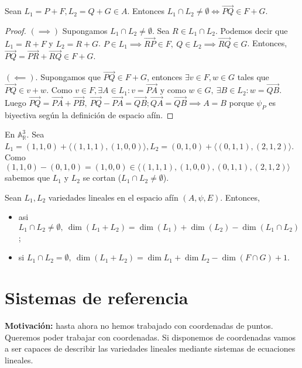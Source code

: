 \documentclass[14pt]{book}
\begin{document}
\begin{pro}
	Sean $L_1 = P + F, L_2 = Q + G \in A$. Entonces $L_1 \cap L_2 ≠ \emptyset \iff \overrightarrow{PQ} \in F + G$.
\end{pro}

\begin{proof}
	$(\implies)$ Supongamos $L_1 \cap L_2 ≠ \emptyset$. Sea $R \in L_1 \cap L_2$. Podemos decir que $L_1 = R + F$ y $L_2 = R + G$. $P \in L_1 \implies \overrightarrow{RP} \in F,\ Q \in L_2 \implies \overrightarrow{RQ} \in G$. Entonces, $\overrightarrow{PQ} = \overrightarrow{PR} + \overrightarrow{RQ} \in F + G$.
	
	$(\impliedby)$. Supongamos que $\overrightarrow{PQ} \in F + G$, entonces $\exists v \in F, w \in G$ tales que $\overrightarrow{PQ} \in v + w$. Como $v \in F, \exists A \in L_1 : v = \overrightarrow{PA}$ y como $w \in G,\ \exists B \in L_2 : w = \overrightarrow{QB}$. Luego $\overrightarrow{PQ} = \overrightarrow{PA} + \overrightarrow{PB},\ \overrightarrow{PQ} - \overrightarrow{PA} = \overrightarrow{QB}; \overrightarrow{QA} = \overrightarrow{QB} \implies A = B$ porque $\psi_P$ es biyectiva según la definición de espacio afín.
\end{proof}

\begin{ej}
	En $\mathbb{A}_\mathbb{R}^3$. Sea $L_1 = (1,1,0) + \langle(1,1,1),(1,0,0)\rangle, L_2 = (0,1,0) + \langle (0,1,1),(2,1,2)\rangle$. Como $(1,1,0) - (0,1,0) = (1,0,0) \in \langle (1,1,1),(1,0,0),(0,1,1),(2,1,2)\rangle$ sabemos que $L_1$ y $L_2$ se cortan ($L_1 \cap L_2 ≠ \emptyset$).
\end{ej}

\begin{tm}
	Sean $L_1, L_2$ variedades lineales en el espacio afín $(A, \psi, E)$. Entonces,
	\begin{itemize}
		\item asi $L_1 \cap L_2 ≠ \emptyset,\ \dim(L_1 + L_2) = \dim(L_1) + \dim(L_2) - \dim(L_1 \cap L_2)$;
		\item si $L_1 \cap L_2 = \emptyset,\ \dim (L_1 + L_2) = \dim L_1 + \dim L_2 - \dim(F \cap G) + 1$.
	\end{itemize}
\end{tm}


\section{Sistemas de referencia}
\textbf{Motivación:} hasta ahora no hemos trabajado con coordenadas de puntos. Queremos poder trabajar con coordenadas. Si disponemos de coordenadas vamos a ser capaces de describir las variedades lineales mediante sistemas de ecuaciones lineales.
\end{document}
